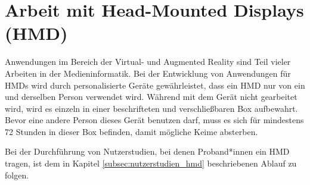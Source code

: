 \section{Arbeit mit Head-Mounted Displays (HMD)}\label{sec:hmd}

Anwendungen im Bereich der Virtual- und Augmented Reality sind Teil vieler Arbeiten in der Medieninformatik.
Bei der Entwicklung von Anwendungen für HMDs wird durch personalisierte Geräte gewährleistet, dass ein HMD nur von ein und derselben Person verwendet wird.
Während mit dem Gerät nicht gearbeitet wird, wird es einzeln in einer beschrifteten und verschließbaren Box aufbewahrt.
Bevor eine andere Person dieses Gerät benutzen darf, muss es sich für mindestens 72 Stunden in dieser Box befinden, damit mögliche Keime absterben.

\medskip
\noindent
Bei der Durchführung von Nutzerstudien, bei denen Proband*innen ein HMD tragen, ist dem in Kapitel \ref{subsec:nutzerstudien_hmd} beschriebenen Ablauf zu folgen.

